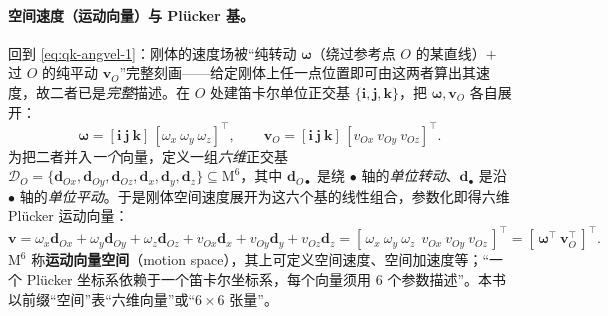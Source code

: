 \paragraph{空间速度（运动向量）与 Plücker 基。}
回到 \cref{eq:qk-angvel-1}：刚体的速度场被“纯转动 $\boldsymbol{\omega}$（绕过参考点 $O$ 的某直线）$+$ 过 $O$ 的纯平动 $\boldsymbol{v}_O$”完整刻画——给定刚体上任一点位置即可由这两者算出其速度，故二者已是\emph{完整}描述\cite{yu2021quadruped}。在 $O$ 处建笛卡尔单位正交基 $\{\boldsymbol{i},\boldsymbol{j},\boldsymbol{k}\}$，把 $\boldsymbol{\omega},\boldsymbol{v}_O$ 各自展开：
\begin{equation}
  \boldsymbol{\omega}=[\boldsymbol{i}\ \boldsymbol{j}\ \boldsymbol{k}]\,[\omega_x\ \omega_y\ \omega_z]^\top,
  \qquad
  \boldsymbol{v}_O=[\boldsymbol{i}\ \boldsymbol{j}\ \boldsymbol{k}]\,[v_{Ox}\ v_{Oy}\ v_{Oz}]^\top.
  \label{eq:qk-plucker-basis-3d}
\end{equation}
为把二者并入\emph{一个}向量，定义一组\emph{六维}正交基 $\mathcal{D}_O=\{\boldsymbol{d}_{Ox},\boldsymbol{d}_{Oy},\boldsymbol{d}_{Oz},\boldsymbol{d}_x,\boldsymbol{d}_y,\boldsymbol{d}_z\}\subseteq\mathrm{M}^6$，其中 $\boldsymbol{d}_{O\bullet}$ 是绕 $\bullet$ 轴的\emph{单位转动}、$\boldsymbol{d}_\bullet$ 是沿 $\bullet$ 轴的\emph{单位平动}。于是刚体空间速度展开为这六个基的线性组合，参数化即得六维 Plücker 运动向量\cite{yu2021quadruped}：
\begin{equation}
  \boldsymbol{v}=\omega_x\boldsymbol{d}_{Ox}+\omega_y\boldsymbol{d}_{Oy}+\omega_z\boldsymbol{d}_{Oz}+v_{Ox}\boldsymbol{d}_x+v_{Oy}\boldsymbol{d}_y+v_{Oz}\boldsymbol{d}_z
  =[\,\omega_x\ \omega_y\ \omega_z\ \ v_{Ox}\ v_{Oy}\ v_{Oz}\,]^\top=[\,\boldsymbol{\omega}^\top\ \boldsymbol{v}_O^\top\,]^\top.
  \label{eq:qk-spatial-vel}
\end{equation}
$\mathrm{M}^6$ 称\textbf{运动向量空间}（motion space），其上可定义空间速度、空间加速度等；“一个 Plücker 坐标系依赖于一个笛卡尔坐标系，每个向量须用 $6$ 个参数描述”\cite{yu2021quadruped}。本书以前缀“空间”表“六维向量”或“$6\times6$ 张量”。

